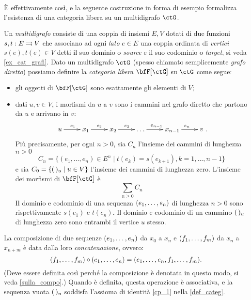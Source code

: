 \`E effettivamente così, e la seguente costruzione in forma di esempio formalizza l'esistenza di una categoria libera su un multidigrafo \(\ctG\).
\begin{example}\label{ex_cat_libera}
	Un \emph{multidigrafo} consiste di una coppia di insiemi \(E,V\) dotati di due funzioni \(s,t : E\rightrightarrows V\) che associano ad ogni \emph{lato} \(e\in E\) una coppia ordinata di \emph{vertici} \(s(e),t(e)\in V\) detti il suo dominio o \emph{source} e il suo codominio o \emph{target}, si veda \ref{ex_cat_grafi}. Dato un multidigrafo \(\ctG\) (spesso chiamato semplicemente \emph{grafo diretto}) possiamo definire la \emph{categoria libera} \(\bfF[\ctG]\) su \(\ctG\) come segue:
	\begin{itemize}
		\item gli oggetti di \(\bfF[\ctG]\) sono esattamente gli elementi di \(V\);
		\item dati \(u,v\in V\), i morfismi da \(u\) a \(v\) sono i cammini nel grafo diretto che partono da \(u\) e arrivano in \(v\):
		      \[\xymatrix{u \ar[r]^{e_1}& x_1 \ar[r]^{e_2}& x_2\ar[r]^{e_3}& \dots\ar[r]^{e_{n-1}}& x_{n-1}\ar[r]^{e_n}& v}.\]
		      Più precisamente, per ogni \(n>0\), sia \(C_n\) l'insieme dei cammini di lunghezza \(n>0\)
		      \[C_n=\{(e_1,\ldots,e_n)\in E^n \mid t(e_k)=s(e_{k+1}), k=1,\ldots,n-1\}\]
		      e sia \(C_0=\{(\,)_u \mid u\in V\}\) l'insieme dei cammini di lunghezza zero.
		      L'insieme dei morfismi di \(\bfF[\ctG]\) è
		      \[\sum_{n\ge0}C_n\]
		      Il dominio e codominio di una sequenza \((\tup en,)\) di lunghezza \(n>0\) sono rispettivamente \(s(e_1)\) e \(t(e_n)\).
		      Il dominio e codominio di un cammino \((\,)_u\) di lunghezza zero sono entrambi il vertice \(u\) stesso.
	\end{itemize}
	La composizione di due sequenze \((\tup en,)\) da \(x_0\) a \(x_n\) e \((\tup fm,)\) da \(x_n\) a \(x_{n+m}\) è data dalla loro \emph{concatenazione}, ovvero:
	\[(\tup fm,)\cmp(\tup en,) = (\tup en, , \tup fm,).\]
	(Deve essere definita così perché la composizione è denotata in questo modo, si veda \ref{sulla_compo}.) Quando è definita, questa operazione è associativa, e la sequenza vuota \((\,)_u\) soddisfa l'assioma di identità \ref{cp_1} nella \ref{def_categ}.
	\begin{figure}
		\begin{center}
\end{center}
\end{figure}
\end{example}
